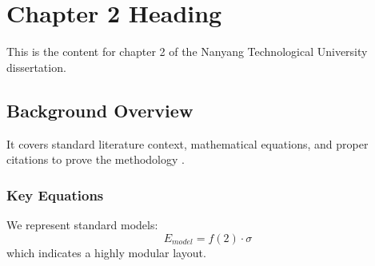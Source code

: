 \chapter{Chapter 2 Heading}
\label{ch:chapter2}
This is the content for chapter 2 of the Nanyang Technological University dissertation.

\section{Background Overview}
It covers standard literature context, mathematical equations, and proper citations to prove the methodology \cite{texbook}.

\subsection{Key Equations}
We represent standard models:
\begin{equation}
    E_{model} = f(2) \cdot \sigma
\end{equation}
which indicates a highly modular layout.
